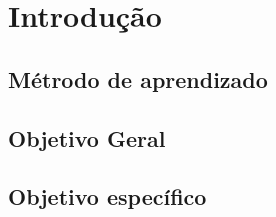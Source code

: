 \chapter[Introdução]{Introdução}

\section{Métrodo de aprendizado}
\section{Objetivo Geral}
\section{Objetivo específico}